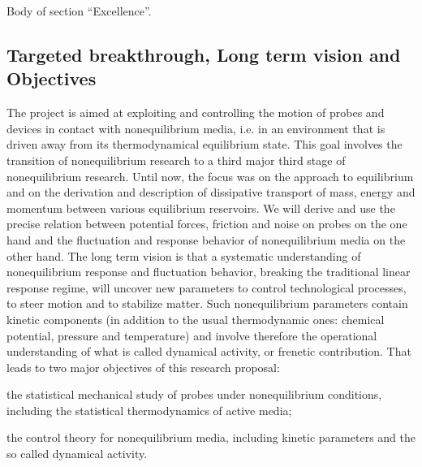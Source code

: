 
Body of section ``Excellence''.

\subsection{Targeted breakthrough, Long term vision and Objectives}\label{sec:objectives}


The project is aimed at exploiting and controlling the motion of probes and devices in
contact with nonequilibrium media, i.e. in an environment that is driven away from its
thermodynamical equilibrium state.
%
This goal involves the transition of nonequilibrium research to a third major third stage of
nonequilibrium research. Until now, the focus was on the approach to equilibrium and on the
derivation and description of dissipative transport of mass, energy and momentum between
various equilibrium reservoirs.
%
We will derive and use the precise relation between potential forces, friction
and noise on probes on the one hand and the fluctuation and response behavior of
nonequilibrium media on the other hand.
%
The long term vision is that a systematic understanding of nonequilibrium response and
fluctuation behavior, breaking the traditional linear response regime, will uncover new
parameters to control technological processes, to steer motion and to stabilize matter.
%
Such nonequilibrium parameters contain kinetic components (in addition to the usual
thermodynamic ones: chemical potential, pressure and temperature) and involve therefore the
operational understanding of what is called dynamical activity, or frenetic contribution.
%
That leads to two major objectives of this research proposal:
\begin{inparaenum}[A.]
\item the statistical mechanical study of probes under nonequilibrium conditions, including the statistical thermodynamics of active media;
\item the control theory for nonequilibrium media, including kinetic parameters and the so called dynamical activity.
\end{inparaenum}

